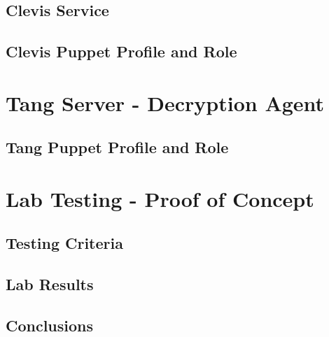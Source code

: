 \newpage
\subsection{Clevis Service}

\newpage
\subsection{Clevis Puppet Profile and Role}


\newpage
\section{Tang Server - Decryption Agent}

\subsection{Tang Puppet Profile and Role}

\newpage
\section{Lab Testing - Proof of Concept}
\subsection{Testing Criteria}
\subsection{Lab Results}
\subsection{Conclusions}
\newpage